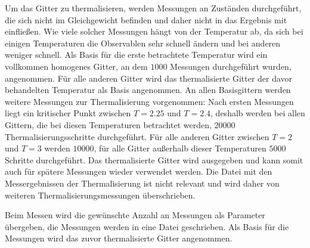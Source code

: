 	Um das Gitter zu thermalisieren, werden Messungen an Zuständen durchgeführt, die sich nicht im Gleichgewicht befinden und daher nicht in das Ergebnis mit einfließen. Wie viele solcher Messungen hängt von der Temperatur ab, da sich bei einigen Temperaturen die Observablen sehr schnell ändern und bei anderen weniger schnell. Als Basis für die erste betrachtete Temperatur wird ein vollkommen homogenes Gitter, an dem $\num{1000}$ Messungen durchgeführt wurden, angenommen. Für alle anderen Gitter wird das thermalisierte Gitter der davor behandelten Temperatur als Basis angenommen. An allen Basisgittern werden weitere Messungen zur Thermalisierung vorgenommen: Nach ersten Messungen liegt ein kritischer Punkt zwischen $T=\num{2,25}$ und $T=\num{2,4}$, deshalb werden bei allen Gittern, die bei diesen Temperaturen betrachtet werden, $\num{20000}$ Thermalisierungsschritte durchgeführt. Für alle anderen Gitter zwischen $T=\num{2}$ und $T=\num{3}$ werden $\num{10000}$, für alle Gitter außerhalb dieser Temperaturen $\num{5000}$ Schritte durchgeführt.
	Das thermalisierte Gitter wird ausgegeben und kann somit auch für spätere Messungen wieder verwendet werden. Die Datei mit den Messergebnissen der Thermalisierung ist nicht relevant und wird daher von weiteren Thermalisierungsmessungen überschrieben.
	
	Beim Messen wird die gewünschte Anzahl an Messungen als Parameter übergeben, die Messungen werden in eine Datei geschrieben. Als Basis für die Messungen wird das zuvor thermalisierte Gitter angenommen.
	
